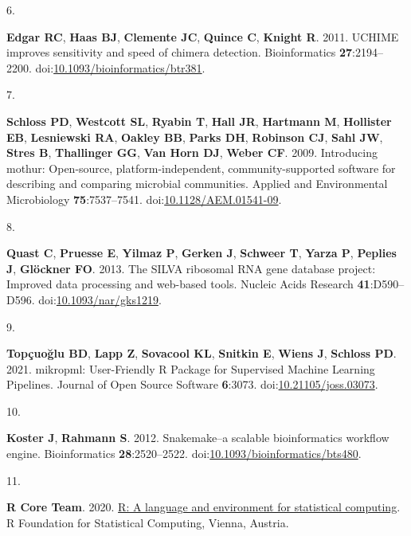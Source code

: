 \documentclass[
]{article}
\newlength{\cslhangindent}
\newlength{\csllabelwidth}
\newlength{\cslentryspacingunit} %
\newenvironment{CSLReferences}[2] %
 {%
  \setlength{\parindent}{0pt}
  \ifodd #1
  \let\oldpar\par
  \def\par{\hangindent=\cslhangindent\oldpar}
  \fi
  \setlength{\parskip}{#2\cslentryspacingunit}
 }%
 {}
\newcommand{\CSLLeftMargin}[1]{\parbox[t]{\csllabelwidth}{#1}}
\newcommand{\CSLRightInline}[1]{\parbox[t]{\linewidth - \csllabelwidth}{#1}\break}
\begin{document}
\begin{CSLReferences}{0}{1}
\leavevmode{}%
\CSLLeftMargin{6. }
\CSLRightInline{\textbf{Edgar RC}, \textbf{Haas BJ}, \textbf{Clemente
JC}, \textbf{Quince C}, \textbf{Knight R}. 2011. UCHIME improves
sensitivity and speed of chimera detection. Bioinformatics
\textbf{27}:2194--2200.
doi:\href{https://doi.org/10.1093/bioinformatics/btr381}{10.1093/bioinformatics/btr381}.}

\leavevmode{}%
\CSLLeftMargin{7. }
\CSLRightInline{\textbf{Schloss PD}, \textbf{Westcott SL},
\textbf{Ryabin T}, \textbf{Hall JR}, \textbf{Hartmann M},
\textbf{Hollister EB}, \textbf{Lesniewski RA}, \textbf{Oakley BB},
\textbf{Parks DH}, \textbf{Robinson CJ}, \textbf{Sahl JW}, \textbf{Stres
B}, \textbf{Thallinger GG}, \textbf{Van Horn DJ}, \textbf{Weber CF}.
2009. Introducing mothur: Open-source, platform-independent,
community-supported software for describing and comparing microbial
communities. Applied and Environmental Microbiology
\textbf{75}:7537--7541.
doi:\href{https://doi.org/10.1128/AEM.01541-09}{10.1128/AEM.01541-09}.}

\leavevmode{}%
\CSLLeftMargin{8. }
\CSLRightInline{\textbf{Quast C}, \textbf{Pruesse E}, \textbf{Yilmaz P},
\textbf{Gerken J}, \textbf{Schweer T}, \textbf{Yarza P}, \textbf{Peplies
J}, \textbf{Glöckner FO}. 2013. The SILVA ribosomal RNA gene database
project: Improved data processing and web-based tools. Nucleic Acids
Research \textbf{41}:D590--D596.
doi:\href{https://doi.org/10.1093/nar/gks1219}{10.1093/nar/gks1219}.}

\leavevmode{}%
\CSLLeftMargin{9. }
\CSLRightInline{\textbf{Topçuoğlu BD}, \textbf{Lapp Z}, \textbf{Sovacool
KL}, \textbf{Snitkin E}, \textbf{Wiens J}, \textbf{Schloss PD}. 2021.
mikropml: User-Friendly R Package for Supervised Machine Learning
Pipelines. Journal of Open Source Software \textbf{6}:3073.
doi:\href{https://doi.org/10.21105/joss.03073}{10.21105/joss.03073}.}

\leavevmode{}%
\CSLLeftMargin{10. }
\CSLRightInline{\textbf{Koster J}, \textbf{Rahmann S}. 2012.
Snakemake--a scalable bioinformatics workflow engine. Bioinformatics
\textbf{28}:2520--2522.
doi:\href{https://doi.org/10.1093/bioinformatics/bts480}{10.1093/bioinformatics/bts480}.}

\leavevmode{}%
\CSLLeftMargin{11. }
\CSLRightInline{\textbf{R Core Team}. 2020.
\href{https://www.R-project.org/}{R: A language and environment for
statistical computing}. R Foundation for Statistical Computing, Vienna,
Austria.}


\end{CSLReferences}
\end{document}
